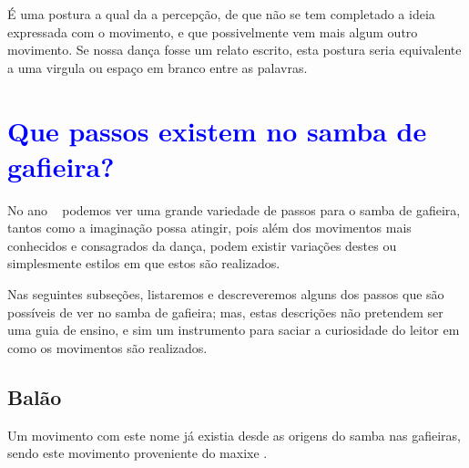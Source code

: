 \begin{definition} 
\label{def:PosturaTransicao}
É uma postura a qual da a percepção, 
de que não se tem completado a ideia expressada com o movimento, e que possivelmente vem mais algum outro movimento.
Se nossa dança fosse um relato escrito, esta postura seria equivalente a uma virgula ou espaço em branco entre as palavras.
\end{definition}


\section{\textcolor{blue}{Que passos existem no samba de gafieira?}}

No ano \AnoLivro~ podemos ver uma grande variedade de passos para o samba de gafieira,
tantos como a imaginação possa atingir, pois além dos movimentos mais conhecidos e  consagrados da dança,
podem existir variações  destes ou simplesmente estilos em que estos são realizados. 

Nas seguintes subseções, listaremos e descreveremos 
alguns dos passos que são possíveis de ver no samba de gafieira;
mas, estas descrições não pretendem ser uma guia de ensino,
e sim um instrumento para saciar a curiosidade do leitor em como os movimentos são realizados.\\


\subsection{Balão} 
\label{def:PassoBalao}
Um movimento com este nome já existia desde as origens do samba nas gafieiras, 
sendo este movimento proveniente do maxixe \cite[pp. 142]{perna2002samba} 
\cite[pp. 93]{efege1974maxixe} \cite[pp. 465]{marcondes1977enciclopedia}.



